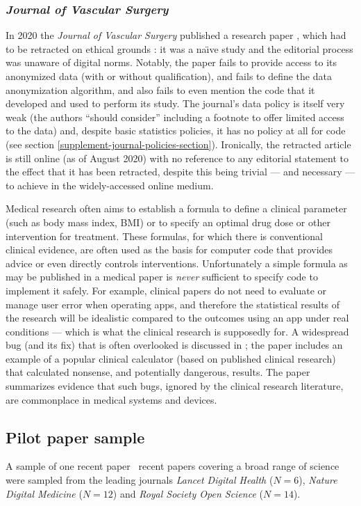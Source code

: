 \documentclass[10pt,a4paper]{article}
\def\plural#1#2{\ifnum #1=1 
	one #2%
\else
	\the#1\ #2s%
\fi}
\def\journalBreakdown{\emph{Lancet Digital Health\/} ($N=6$), \emph{Nature Digital Medicine\/} ($N=12$) and \emph{Royal Society Open Science\/} ($N=14$)}
\begin{document}
\subsubsection{\emph{Journal of Vascular Surgery}}\label{supplement-vascular-surgery-note}
In 2020 the \emph{Journal of Vascular Surgery\/} published a research paper \cite{jvs1}, which had to be retracted on ethical grounds \cite{jvs2,jvs3}: it was a na\"\i ve study and the editorial process was unaware of digital norms. Notably, the paper fails to provide access to its anonymized data (with or without qualification), and fails to define the data anonymization algorithm, and also fails to even mention the code that it developed and used to perform its study. The journal's data policy is itself very weak (the authors ``should consider'' including a footnote to offer limited access to the data) and, despite basic statistics policies, it has no policy at all for code (see section \ref{supplement-journal-policies-section}). Ironically, the retracted article \cite{jvs1} is still online (as of August 2020) with no reference to any editorial statement to the effect that it has been retracted, despite this being trivial --- and necessary --- to achieve in the widely-accessed online medium.

Medical research often aims to establish a formula to define a clinical parameter (such as body mass index, BMI) or to specify an optimal drug dose or other intervention for treatment. These formulas, for which there is conventional clinical evidence, are often used as the basis for computer code that provides advice or even directly controls interventions. Unfortunately a simple formula as may be published in a medical paper is \emph{never\/} sufficient to specify code to implement it safely. For example, clinical papers do not need to evaluate or manage user error when operating apps, and therefore the statistical results of the research will be idealistic compared to the outcomes using an app under real conditions --- which is what the clinical research is supposedly for. A widespread bug (and its fix) that is often overlooked is discussed in \cite{numerals}; the paper includes an example of a popular clinical calculator (based on published clinical research) that calculated nonsense, and potentially dangerous, results. The paper \cite{fda} summarizes evidence that such bugs, ignored by the clinical research literature, are commonplace in medical systems and devices.

\subsection{Pilot paper sample}
A sample of \plural{\dataN}{recent paper} covering a broad range of science were sampled from the leading journals \journalBreakdown. 
\end{document}
